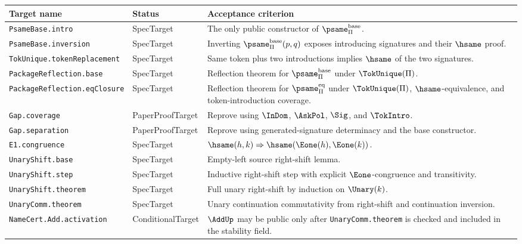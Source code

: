 \begin{longtable}{p{}p{}p{}}
\toprule
\textbf{Target name} & \textbf{Status} & \textbf{Acceptance criterion}\\
\midrule
\texttt{PsameBase.intro} & SpecTarget & The only public constructor of \(\psame_{\Pi}^{\mathrm{base}}\).\\
\texttt{PsameBase.inversion} & SpecTarget & Inverting \(\psame_{\Pi}^{\mathrm{base}}(p,q)\) exposes introducing signatures and their \(\hsame\) proof.\\
\texttt{TokUnique.tokenReplacement} & SpecTarget & Same token plus two introductions implies \(\hsame\) of the two signatures.\\
\texttt{PackageReflection.base} & SpecTarget & Reflection theorem for \(\psame_{\Pi}^{\mathrm{base}}\) under \(\TokUnique(\Pi)\).\\
\texttt{PackageReflection.eqClosure} & SpecTarget & Reflection theorem for \(\psame_{\Pi}^{\mathrm{eq}}\) under \(\TokUnique(\Pi)\), \(\hsame\)-equivalence, and token-introduction coverage.\\
\texttt{Gap.coverage} & PaperProofTarget & Reprove using \(\InDom\), \(\AskPol\), \(\Sig\), and \(\TokIntro\).\\
\texttt{Gap.separation} & PaperProofTarget & Reprove using generated-signature determinacy and the base constructor.\\
\texttt{E1.congruence} & SpecTarget & \(\hsame(h,k)\Rightarrow\hsame(\Eone(h),\Eone(k))\).\\
\texttt{UnaryShift.base} & SpecTarget & Empty-left source right-shift lemma.\\
\texttt{UnaryShift.step} & SpecTarget & Inductive right-shift step with explicit \(\Eone\)-congruence and transitivity.\\
\texttt{UnaryShift.theorem} & SpecTarget & Full unary right-shift by induction on \(\Unary(k)\).\\
\texttt{UnaryComm.theorem} & SpecTarget & Unary continuation commutativity from right-shift and continuation inversion.\\
\texttt{NameCert.Add.activation} & ConditionalTarget & \(\AddUp\) may be public only after \texttt{UnaryComm.theorem} is checked and included in the stability field.\\
\bottomrule
\end{longtable}

